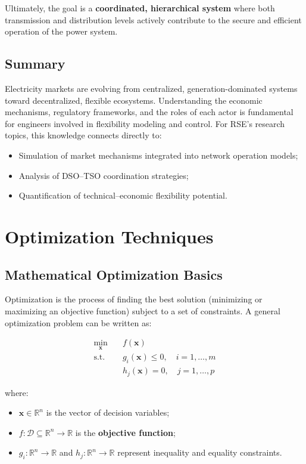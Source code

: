 \documentclass[11pt]{article}
\begin{document}
	Ultimately, the goal is a \textbf{coordinated, hierarchical system} where both transmission and distribution levels actively contribute to the secure and efficient operation of the power system.
	
	\subsection*{Summary}
	
	Electricity markets are evolving from centralized, generation-dominated systems toward decentralized, flexible ecosystems.  
	Understanding the economic mechanisms, regulatory frameworks, and the roles of each actor is fundamental for engineers involved in flexibility modeling and control.  
	For RSE’s research topics, this knowledge connects directly to:
	\begin{itemize}
		\item Simulation of market mechanisms integrated into network operation models;
		\item Analysis of DSO–TSO coordination strategies;
		\item Quantification of technical–economic flexibility potential.
	\end{itemize}
	
	
	\section{Optimization Techniques}
	
	\subsection{Mathematical Optimization Basics}
	
	Optimization is the process of finding the best solution (minimizing or maximizing an objective function) subject to a set of constraints.  
	A general optimization problem can be written as:
	
	\[
	\begin{aligned}
		\min_{\mathbf{x}} \quad & f(\mathbf{x}) \\
		\text{s.t.} \quad & g_i(\mathbf{x}) \le 0, \quad i = 1, \ldots, m \\
		& h_j(\mathbf{x}) = 0, \quad j = 1, \ldots, p
	\end{aligned}
	\]
	
	where:
	\begin{itemize}
		\item $\mathbf{x} \in \mathbb{R}^n$ is the vector of decision variables;
		\item $f:\mathcal{D}\subseteq\mathbb{R}^n\to\mathbb{R}$ is the \textbf{objective function};
		\item $g_i:\mathbb{R}^n\to\mathbb{R}$ and $h_j:\mathbb{R}^n\to\mathbb{R}$ represent inequality and equality constraints.
	\end{itemize}
	
\end{document}
